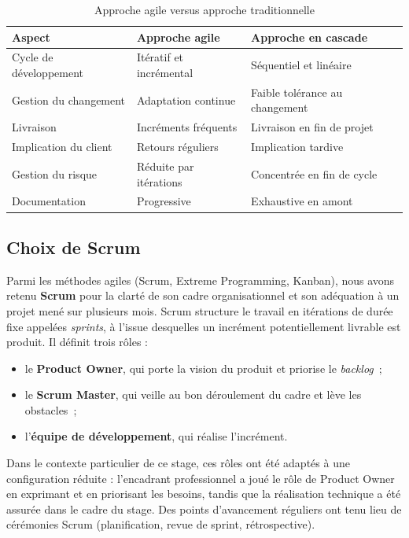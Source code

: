 \begin{table}[H]
\centering
\caption{Approche agile versus approche traditionnelle}
\label{tab:agile-vs-cascade}
\small
\begin{tabularx}{\linewidth}{lXX}
\toprule
\textbf{Aspect} & \textbf{Approche agile} & \textbf{Approche en cascade} \\
\midrule
Cycle de développement & Itératif et incrémental & Séquentiel et linéaire \\
Gestion du changement & Adaptation continue & Faible tolérance au changement \\
Livraison & Incréments fréquents & Livraison en fin de projet \\
Implication du client & Retours réguliers & Implication tardive \\
Gestion du risque & Réduite par itérations & Concentrée en fin de cycle \\
Documentation & Progressive & Exhaustive en amont \\
\bottomrule
\end{tabularx}
\end{table}

\subsection{Choix de Scrum}
Parmi les méthodes agiles (Scrum, Extreme Programming, Kanban), nous avons
retenu \textbf{Scrum} pour la clarté de son cadre organisationnel et son
adéquation à un projet mené sur plusieurs mois. Scrum structure le travail
en itérations de durée fixe appelées \emph{sprints}, à l'issue desquelles
un incrément potentiellement livrable est produit. Il définit trois rôles :

\begin{itemize}[leftmargin=1.4cm]
  \item le \textbf{Product Owner}, qui porte la vision du produit et
  priorise le \emph{backlog}~;
  \item le \textbf{Scrum Master}, qui veille au bon déroulement du cadre et
  lève les obstacles~;
  \item l'\textbf{équipe de développement}, qui réalise l'incrément.
\end{itemize}

Dans le contexte particulier de ce stage, ces rôles ont été adaptés à une
configuration réduite : l'encadrant professionnel a joué le rôle de Product
Owner en exprimant et en priorisant les besoins, tandis que la réalisation
technique a été assurée dans le cadre du stage. Des points d'avancement
réguliers ont tenu lieu de cérémonies Scrum (planification, revue de
sprint, rétrospective).

